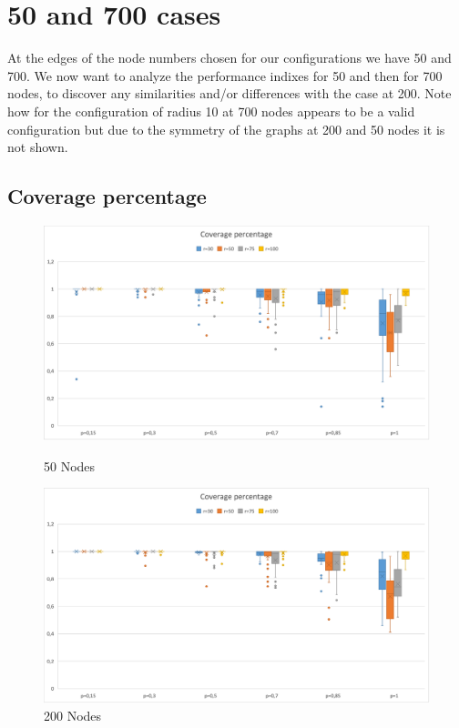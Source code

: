 \section{50 and 700 cases}
At the edges of the node numbers chosen for our configurations we have 50 and 700. We now want to analyze the performance indixes for 50 and then for 700 nodes, to discover any similarities and/or differences with the case at 200. Note how for the configuration of radius 10 at 700 nodes appears to be a valid configuration but due to the symmetry of the graphs at 200 and 50 nodes it is not shown.

\subsection{Coverage percentage}
\begin{figure}[H]
  \includegraphics[width=\linewidth]{./images/Rate50Boxplot.png}
  \caption{50 Nodes}\label{fig:awesome_image1}
\endminipage\hfill
{}
  \includegraphics[width=\linewidth]{./images/Rate200Boxplot.png}
  \caption{200 Nodes}\label{fig:awesome_image2}
\endminipage
\end{figure}

